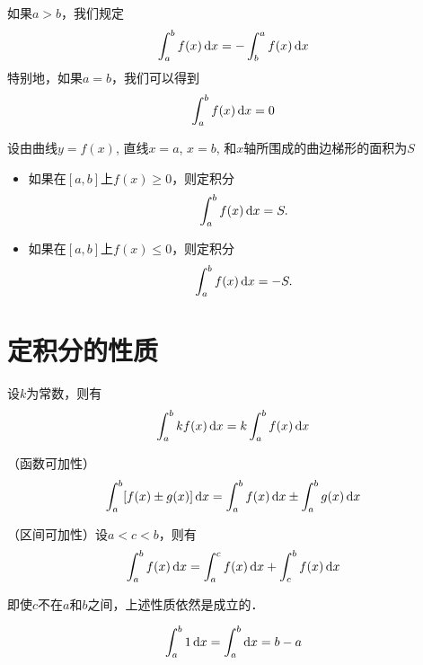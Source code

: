 \documentclass[14pt,notheorems,leqno,xcolor={rgb}]{beamer} %
\begin{document}
\begin{frame}
\begin{remark}
如果$a>b$，我们规定
\[ \int_a^b f(x)\mathop{}\!\mathrm{d} x = -\int_b^a f(x)\mathop{}\!\mathrm{d} x \]\pause
特别地，如果$a=b$，我们可以得到
\[ \int_a^b f(x)\mathop{}\!\mathrm{d} x = 0 \]
\end{remark}
\end{frame}

\begin{frame}
\begin{remark}
设由曲线$y=f(x)$, 直线$x=a$, $x=b$, 和$x$轴所围成的曲边梯形的面积为$S$
\begin{itemize}[<+->]
\item 如果在$[a,b]$上$f(x)\geq 0$，则定积分$$\int_a^b f(x)\mathop{}\!\mathrm{d} x=S.$$
\item 如果在$[a,b]$上$f(x)\leq 0$，则定积分$$\int_a^b f(x)\mathop{}\!\mathrm{d} x=-S.$$
\end{itemize}
\end{remark}
\end{frame}

\section{定积分的性质}

\begin{frame}
\begin{property}设$k$为常数，则有
\[ \int_a^b kf(x)\mathop{}\!\mathrm{d} x=k\int_a^b f(x)\mathop{}\!\mathrm{d} x\]
\end{property}\pause
\begin{property}（函数可加性）
\[ \int_a^b [f(x) \pm g(x)]\mathop{}\!\mathrm{d} x = \int_a^b f(x)\mathop{}\!\mathrm{d} x \pm \int_a^b g(x) \mathop{}\!\mathrm{d} x \]
\end{property}
\end{frame}

\begin{frame}
\begin{property}（区间可加性）设$a<c<b$，则有
\[ \int_a^b f(x)\mathop{}\!\mathrm{d} x = \int_a^c f(x)\mathop{}\!\mathrm{d} x + \int_c^b f(x)\mathop{}\!\mathrm{d} x \]
\end{property}\pause
\begin{remark}
即使$c$不在$a$和$b$之间，上述性质依然是成立的．
\end{remark}
\end{frame}

\begin{frame}
\begin{property}
\[\int_a^b 1\mathop{}\!\mathrm{d} x = \int_a^b \mathop{}\!\mathrm{d} x= b-a\]
\end{property}
\end{frame}
\end{document}
